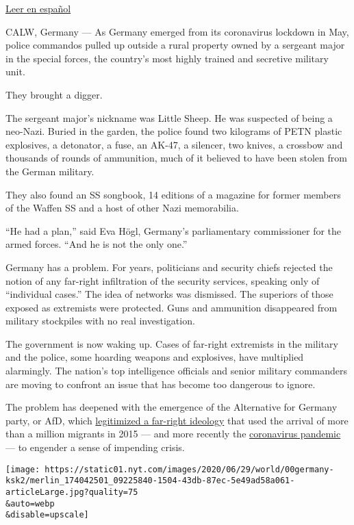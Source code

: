 \href{https://www.nytimes.com/es/2020/07/10/espanol/mundo/alemania-ksk-neonazi.html}{Leer
en español}

CALW, Germany --- As Germany emerged from its coronavirus lockdown in
May, police commandos pulled up outside a rural property owned by a
sergeant major in the special forces, the country's most highly trained
and secretive military unit.

They brought a digger.

The sergeant major's nickname was Little Sheep. He was suspected of
being a neo-Nazi. Buried in the garden, the police found two kilograms
of PETN plastic explosives, a detonator, a fuse, an AK-47, a silencer,
two knives, a crossbow and thousands of rounds of ammunition, much of it
believed to have been stolen from the German military.

They also found an SS songbook, 14 editions of a magazine for former
members of the Waffen SS and a host of other Nazi memorabilia.

``He had a plan,'' said Eva Högl, Germany's parliamentary commissioner
for the armed forces. ``And he is not the only one.''

Germany has a problem. For years, politicians and security chiefs
rejected the notion of any far-right infiltration of the security
services, speaking only of ``individual cases.'' The idea of networks
was dismissed. The superiors of those exposed as extremists were
protected. Guns and ammunition disappeared from military stockpiles with
no real investigation.

The government is now waking up. Cases of far-right extremists in the
military and the police, some hoarding weapons and explosives, have
multiplied alarmingly. The nation's top intelligence officials and
senior military commanders are moving to confront an issue that has
become too dangerous to ignore.

The problem has deepened with the emergence of the Alternative for
Germany party, or AfD, which
\href{https://www.nytimes.com/2019/10/26/world/europe/afd-election-east-germany-hoecke.html}{legitimized
a far-right ideology} that used the arrival of more than a million
migrants in 2015 --- and more recently the
\href{https://www.nytimes.com/2020/05/18/world/europe/coronavirus-germany-far-right.html}{coronavirus
pandemic} --- to engender a sense of impending crisis.

\texttt{[image: https://static01.nyt.com/images/2020/06/29/world/00germany-ksk2/merlin\_174042501\_09225840-1504-43db-87ec-5e49ad58a061-articleLarge.jpg?quality=75\\\&auto=webp\\\&disable=upscale]}

